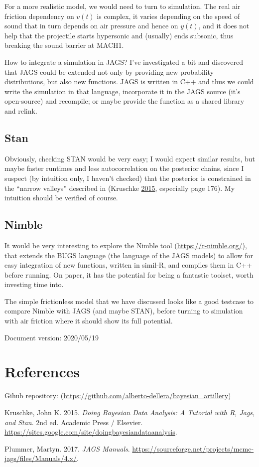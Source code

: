 \documentclass[]{article}
\begin{document}
For a more realistic model, we would need to turn to simulation. The
real air friction dependency on \(v(t)\) is complex, it varies depending
on the speed of sound that in turn depends on air pressure and hence on
\(y(t)\), and it does not help that the projectile starts hypersonic and
(usually) ends subsonic, thus breaking the sound barrier at MACH1.

How to integrate a simulation in JAGS? I've investigated a bit and
discovered that JAGS could be extended not only by providing new
probability distributions, but also new functions. JAGS is written in
C++ and thus we could write the simulation in that language, incorporate
it in the JAGS source (it's open-source) and recompile; or maybe provide
the function as a shared library and relink.

\hypertarget{stan}{%
\subsection{Stan}\label{stan}}

Obviously, checking STAN would be very easy; I would expect similar
results, but maybe faster runtimes and less autocorrelation on the
posterior chains, since I suspect (by intuition only, I haven't checked)
that the posterior is constrained in the ``narrow valleys'' described in
(Kruschke \protect\hyperlink{ref-DBDA2E}{2015}, especially page 176). My
intuition should be verified of course.

\hypertarget{nimble}{%
\subsection{Nimble}\label{nimble}}

It would be very interesting to explore the Nimble tool
(\url{https://r-nimble.org/}), that extends the BUGS language (the
language of the JAGS models) to allow for easy integration of new
functions, written in simil-R, and compiles them in C++ before running.
On paper, it has the potential for being a fantastic toolset, worth
investing time into.

The simple frictionless model that we have discussed looks like a good
testcase to compare Nimble with JAGS (and maybe STAN), before turning to
simulation with air friction where it should show its full potential.

Document version: 2020/05/19

\hypertarget{references}{%
\section{References}\label{references}}

Gihub repository:
(\url{https://github.com/alberto-dellera/bayesian_artillery})

\hypertarget{refs}{}
\leavevmode\hypertarget{ref-DBDA2E}{}%
Kruschke, John K. 2015. \emph{Doing Bayesian Data Analysis: A Tutorial
with R, Jags, and Stan}. 2nd ed. Academic Press / Elsevier.
\url{https://sites.google.com/site/doingbayesiandataanalysis}.

\leavevmode\hypertarget{ref-JAGSmanual}{}%
Plummer, Martyn. 2017. \emph{JAGS Manuals}.
\url{https://sourceforge.net/projects/mcmc-jags/files/Manuals/4.x/}.
\end{document}
